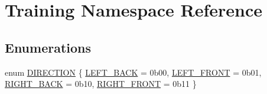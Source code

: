 \hypertarget{namespace_training}{}\section{Training Namespace Reference}
\label{namespace_training}
\subsection*{Enumerations}
\begin{DoxyCompactItemize}
\item 
enum \mbox{\hyperlink{namespace_training_a8174b4453347140eff551a8d9baec7ed}{D\+I\+R\+E\+C\+T\+I\+ON}} \{ \mbox{\hyperlink{namespace_training_a8174b4453347140eff551a8d9baec7eda4ecbc23a6f8f45a7de455ef6e04274e3}{L\+E\+F\+T\+\_\+\+B\+A\+CK}} = 0b00, 
\mbox{\hyperlink{namespace_training_a8174b4453347140eff551a8d9baec7edaae342582450ed44e65791fb0d972ea90}{L\+E\+F\+T\+\_\+\+F\+R\+O\+NT}} = 0b01, 
\mbox{\hyperlink{namespace_training_a8174b4453347140eff551a8d9baec7eda53e90be4adb3817244622e1d101f8d96}{R\+I\+G\+H\+T\+\_\+\+B\+A\+CK}} = 0b10, 
\mbox{\hyperlink{namespace_training_a8174b4453347140eff551a8d9baec7eda890a26f63e2a0ee31c47407f8806190f}{R\+I\+G\+H\+T\+\_\+\+F\+R\+O\+NT}} = 0b11
 \}
\end{DoxyCompactItemize}
